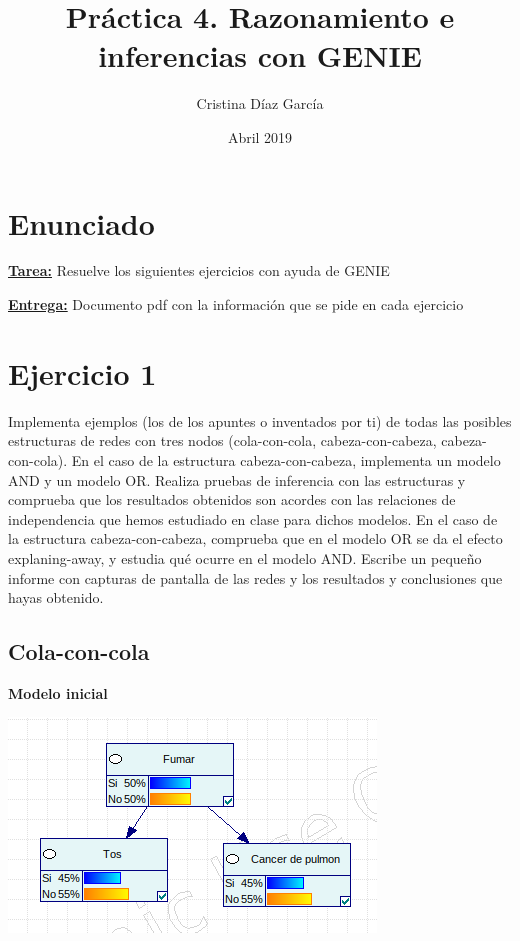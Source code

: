 \documentclass{article}
\title{Práctica 4. Razonamiento e inferencias con GENIE}
\author{Cristina Díaz García}
\date{Abril 2019}
\begin{document}

\begin{titlingpage}
\maketitle
\end{titlingpage}

\newpage

\tableofcontents

\newpage

\section{Enunciado}

\textbf{\underline{Tarea:}} Resuelve los siguientes ejercicios con ayuda de GENIE

\textbf{\underline{Entrega:}} Documento pdf con la información que se pide en cada ejercicio

\section{\textbf{Ejercicio 1}}

Implementa ejemplos (los de los apuntes o inventados por ti) de todas las posibles
estructuras de redes con tres nodos (cola-con-cola, cabeza-con-cabeza, cabeza-con-cola). En el caso de la estructura cabeza-con-cabeza, implementa un modelo AND y un modelo OR. Realiza
pruebas de inferencia con las estructuras y comprueba que los resultados obtenidos son acordes con las relaciones de independencia que hemos estudiado en clase para dichos modelos. En el caso de la estructura cabeza-con-cabeza, comprueba que en el modelo OR se da el efecto
explaning-away, y estudia qué ocurre en el modelo AND. Escribe un pequeño informe con
capturas de pantalla de las redes y los resultados y conclusiones que hayas obtenido.

\subsection{\textbf{Cola-con-cola}}

\textbf{Modelo inicial}

\begin{center}
\includegraphics[scale=0.5]{1a1.png}
\end{center}
\end{document}
